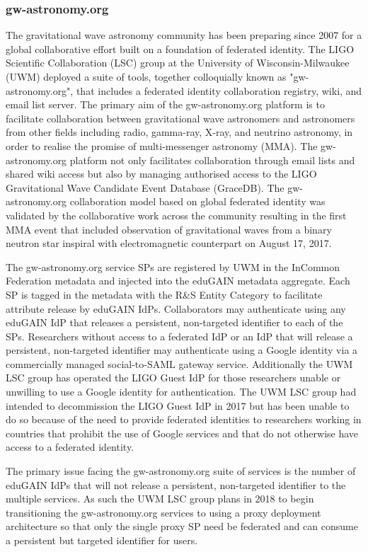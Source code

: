 \documentclass[fleqn,10pt]{wlscirep}
\begin{document}
{\subsubsection{gw-astronomy.org}
The gravitational wave astronomy community has been preparing since 2007 for a global collaborative effort built on a foundation of federated identity. The LIGO Scientific Collaboration (LSC) group at the University of Wisconsin-Milwaukee (UWM) deployed a suite of tools, together colloquially known as "gw-astronomy.org", that includes a federated identity collaboration registry, wiki, and email list server. The primary aim of the gw-astronomy.org platform is to facilitate collaboration between gravitational wave astronomers and astronomers from other fields including radio, gamma-ray, X-ray, and neutrino astronomy, in order to realise the promise of multi-messenger astronomy (MMA). The gw-astronomy.org platform not only facilitates collaboration through email lists and shared wiki access but also by managing authorised access to the LIGO Gravitational Wave Candidate Event Database (GraceDB). The gw-astronomy.org collaboration model based on global federated identity was validated by the collaborative work across the community resulting in the first MMA event that included observation of gravitational waves from a binary neutron star inspiral with electromagnetic counterpart on August 17, 2017.

The gw-astronomy.org service SPs are registered by UWM in the InCommon Federation metadata and injected into the eduGAIN metadata aggregate. Each SP is tagged in the metadata with the R\&S Entity Category to facilitate attribute release by eduGAIN IdPs. Collaborators may authenticate using any eduGAIN IdP that releases a persistent, non-targeted identifier to each of the SPs. Researchers without access to a federated IdP or an IdP that will release a persistent, non-targeted identifier may authenticate using a Google identity via a commercially managed social-to-SAML gateway service. Additionally the UWM LSC group has operated the LIGO Guest IdP for those researchers unable or unwilling to use a Google identity for authentication. The UWM LSC group had intended to decommission the LIGO Guest IdP in 2017 but has been unable to do so because of the need to provide federated identities to researchers working in countries that prohibit the use of Google services and that do not otherwise have access to a federated identity.

The primary issue facing the gw-astronomy.org suite of services is the number of eduGAIN IdPs that will not release a persistent, non-targeted identifier to the multiple services. As such the UWM LSC group plans in 2018 to begin transitioning the gw-astronomy.org services to using a proxy deployment architecture so that only the single proxy SP need be federated and can consume a persistent but targeted identifier for users.


}
\end{document}
